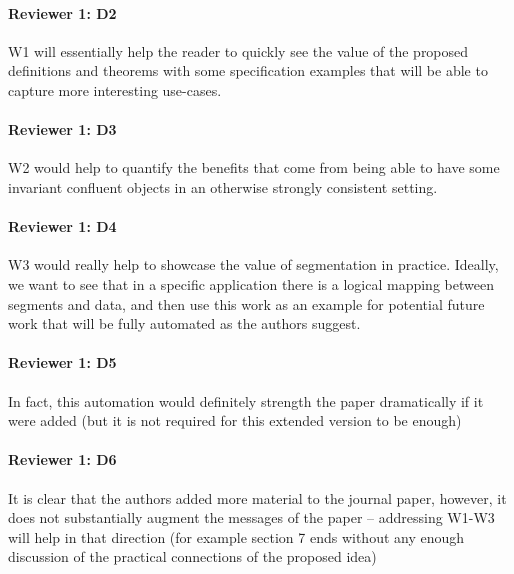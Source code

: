 \documentclass[9pt]{article}
\begin{document}
\begin{multicols*}{2}
\paragraph{Reviewer 1: D2}
\begin{feedback}
  W1 will essentially help the reader to quickly see the value of the proposed
  definitions and theorems with some specification examples that will be able
  to capture more interesting use-cases.
\end{feedback}
\paragraph{Reviewer 1: D3}
\begin{feedback}
  W2 would help to quantify the benefits that come from being able to have some
  invariant confluent objects in an otherwise strongly consistent setting.
\end{feedback}
\paragraph{Reviewer 1: D4}
\begin{feedback}
  W3 would really help to showcase the value of segmentation in practice.
  Ideally, we want to see that in a specific application there is a logical
  mapping between segments and data, and then use this work as an example for
  potential future work that will be fully automated as the authors suggest.
\end{feedback}
\paragraph{Reviewer 1: D5}
\begin{feedback}
  In fact, this automation would definitely strength the paper dramatically if
  it were added (but it is not required for this extended version to be enough)
\end{feedback}
\paragraph{Reviewer 1: D6}
\begin{feedback}
  It is clear that the authors added more material to the journal paper,
  however, it does not substantially augment the messages of the paper --
  addressing W1-W3 will help in that direction (for example section 7 ends
  without any enough discussion of the practical connections of the proposed
  idea)
\end{feedback}

\end{multicols*}
\end{document}

